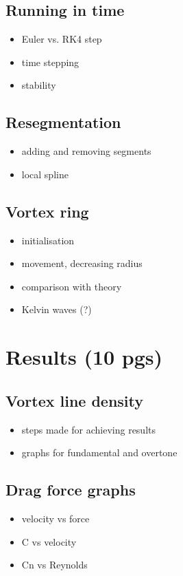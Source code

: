 \documentclass[a4paper, 12pt]{report}
\newcommand{\<}{\langle} %
\renewcommand{\>}{\rangle} %
\begin{document}
\section{Running in time}
\begin{itemize}
	\item Euler vs. RK4 step
	\item time stepping
	\item stability
\end{itemize}

\section{Resegmentation}
\begin{itemize}
	\item adding and removing segments
	\item local spline
\end{itemize}

\section{Vortex ring}
\begin{itemize}
	\item initialisation
	\item movement, decreasing radius
	\item comparison with theory
	\item Kelvin waves (?)
\end{itemize}

\newpage

\chapter{Results (10 pgs)}

\section{Vortex line density}
\begin{itemize}
	\item steps made for achieving results
	\item graphs for fundamental and overtone
\end{itemize}

\section{Drag force graphs}
\begin{itemize}
	\item velocity vs force
	\item C vs velocity
	\item Cn vs Reynolds
\end{itemize}
\end{document}
